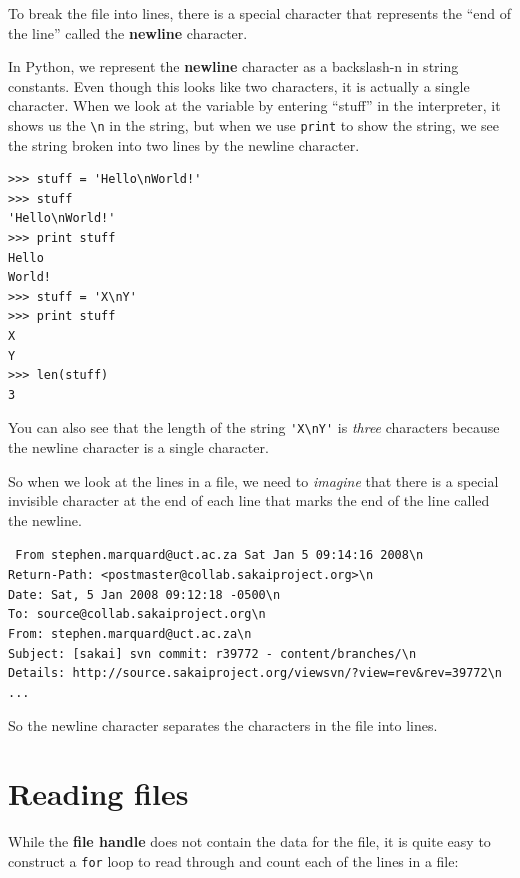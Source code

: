 \documentclass[10pt]{book}
\begin{document}
To break the file into lines, there is a special character that 
represents the ``end of the line'' called the {\bf newline} character.

In Python, we represent the {\bf newline} character as a backslash-n in 
string constants.  Even though this looks like two characters, it
is actually a single character.  When we look at the variable by entering
``stuff'' in the interpreter, it shows us the \verb"\n" in the string, 
but when we use {\tt print} to show the string, we see the string broken
into two lines by the newline character.

\beforeverb
\begin{verbatim}
>>> stuff = 'Hello\nWorld!'
>>> stuff
'Hello\nWorld!'
>>> print stuff
Hello
World!
>>> stuff = 'X\nY'
>>> print stuff
X
Y
>>> len(stuff)
3
\end{verbatim}
\afterverb
%

You can also see that the length of the string \verb"'X\nY'" is \emph{three}
characters because the newline character is a single character.

So when we look at the lines in a file, we need to \emph{imagine}
that there is a special invisible character at the end of each line
that marks the end of the line called the newline.  

{\tt
From stephen.marquard@uct.ac.za Sat Jan  5 09:14:16 2008\verb"\n"\\
Return-Path: <postmaster@collab.sakaiproject.org>\verb"\n"\\
Date: Sat, 5 Jan 2008 09:12:18 -0500\verb"\n"\\
To: source@collab.sakaiproject.org\verb"\n"\\
From: stephen.marquard@uct.ac.za\verb"\n"\\
Subject: [sakai] svn commit: r39772 - content/branches/\verb"\n"\\
Details: http://source.sakaiproject.org/viewsvn/?view=rev\&rev=39772\verb"\n"\\
...
}

So the newline character separates the characters 
in the file into lines.

\section{Reading files}

While the {\bf file handle} does not contain the data for the file,
it is quite easy to construct a {\tt for} loop to read through 
and count each of the lines in a file:
\end{document}
